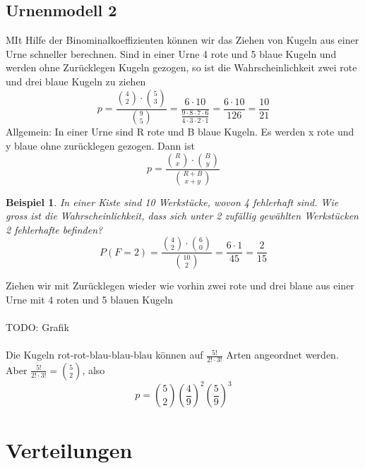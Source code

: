 \documentclass{report}
\newtheorem{myexample}{Beispiel}
\begin{document}
\section{Urnenmodell 2}
MIt Hilfe der Binominalkoeffizienten können wir das Ziehen von Kugeln aus einer Urne schneller berechnen. Sind in einer Urne 4 rote und 5 blaue Kugeln und werden ohne Zurücklegen Kugeln gezogen, so ist die Wahrscheinlichkeit zwei rote und drei blaue Kugeln zu ziehen
\begin{equation}
p = \frac{\binom{4}{2} \cdot \binom{5}{3}}{\binom{9}{5}} = \frac{6 \cdot 10}{\frac{9 \cdot 8 \cdot 7 \cdot 6}{4 \cdot 3 \cdot 2 \cdot 1}} = \frac{6 \cdot 10}{126} = \frac{10}{21}
\end{equation}
Allgemein: In einer Urne sind R rote und B blaue Kugeln. Es werden x rote und y blaue ohne zurücklegen gezogen. Dann ist
\begin{equation}
p = \frac{\binom{R}{x} \cdot \binom{B}{y}}{\binom{R+B}{x+y}}
\end{equation}
\begin{myexample}
In einer Kiste sind 10 Werkstücke, wovon 4 fehlerhaft sind. Wie gross ist die Wahrscheinlichkeit, dass sich unter 2 zufällig gewählten Werkstücken 2 fehlerhafte befinden?
\begin{equation}
P(F=2) = \frac{\binom{4}{2} \cdot \binom{6}{0}}{\binom{10}{2}} = \frac{6 \cdot 1}{45} = \frac{2}{15}
\end{equation}
\end{myexample}
Ziehen wir mit Zurücklegen wieder wie vorhin zwei rote und drei blaue aus einer Urne mit 4 roten und 5 blauen Kugeln
\\\\TODO: Grafik\\\\
Die Kugeln rot-rot-blau-blau-blau können auf $\frac{5!}{2! \cdot 3!}$ Arten angeordnet werden. Aber $\frac{5!}{2! \cdot 3!} = \binom{5}{2}$, also
\begin{equation}
p = \binom{5}{2} (\frac{4}{9})^2 (\frac{5}{9})^3
\end{equation}

\chapter{Verteilungen}
\end{document}
